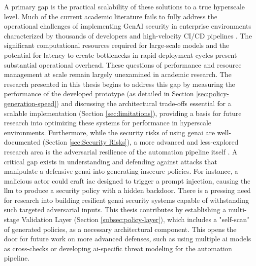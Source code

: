 A primary gap is the practical scalability of these solutions to a true hyperscale level. Much of the current academic literature fails to fully address the operational challenges of implementing GenAI security in enterprise environments characterized by thousands of developers and high-velocity CI/CD pipelines \cite{fu_ai_2025}. The significant computational resources required for large-scale models and the potential for latency to create bottlenecks in rapid deployment cycles present substantial operational overhead. These questions of performance and resource management at scale remain largely unexamined in academic research. The research presented in this thesis begins to address this gap by measuring the performance of the developed prototype (as detailed in Section \ref{sec:policy-generation-speed}) and discussing the architectural trade-offs essential for a scalable implementation (Section \ref{sec:limitations}), providing a basis for future research into optimizing these systems for performance in hyperscale environments.
Furthermore, while the security risks of using \gls{genai} are well-documented (Section \ref{sec:Security Risks}), a more advanced and less-explored research area is the adversarial resilience of the automation pipeline itself \cite{nyoto_cyber_2024,dash_zero-trust_2024}. A critical gap exists in understanding and defending against attacks that manipulate a defensive \gls{genai} into generating insecure policies. For instance, a malicious actor could craft \gls{iac} designed to trigger a prompt injection, causing the \gls{llm} to produce a security policy with a hidden backdoor. There is a pressing need for research into building resilient \gls{genai} security systems capable of withstanding such targeted adversarial inputs. This thesis contributes by establishing a multi-stage Validation Layer (Section \ref{subsec:policy-layer}), which includes a "self-scan" of generated policies, as a necessary architectural component. This opens the door for future work on more advanced defenses, such as using multiple \gls{ai} models as cross-checks or developing \gls{ai}-specific threat modeling for the automation pipeline.


